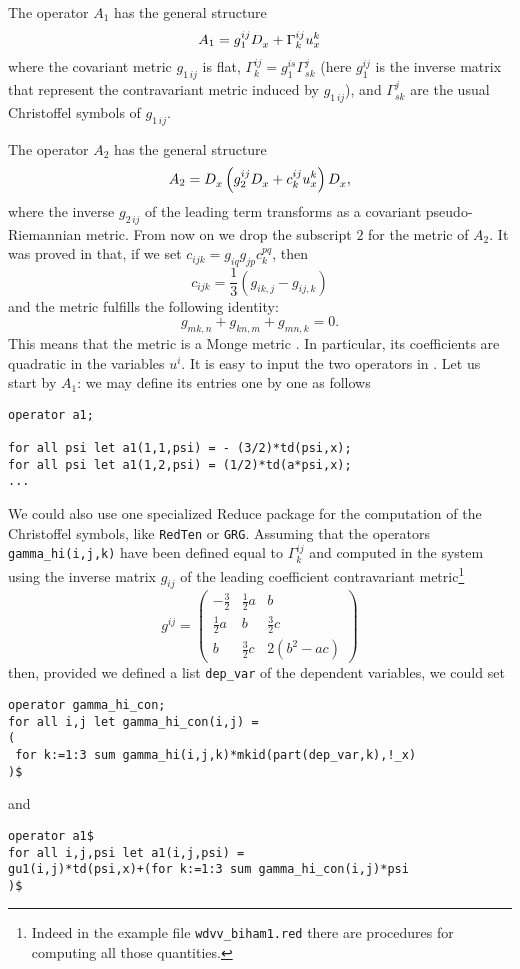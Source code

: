 The operator $A_1$ has the general structure
\[
  A_1 = g_1^{ij}D_x^{} + \Gamma^{ij}_ku^k_x
\]
where the covariant metric $g_{1\,ij}$ is flat, $\Gamma^{ij}_k =
g_1^{is}\Gamma^j_{sk}$ (here $g_1^{ij}$ is the inverse matrix that represent
the contravariant metric induced by $g_{1\,ij}$), and $\Gamma^j_{sk}$ are the
usual Christoffel symbols of $g_{1\,ij}$.

The operator $A_2$ has the general structure
\begin{equation}
  A_2=D_x^{}\left(g^{ij}_2D_x^{}+c_{k}^{ij}u_{x}^{k}\right)D_x^{},  \label{casimir}
\end{equation}
where the inverse $g_{2\,ij}$ of the leading term transforms as a covariant
pseudo-Riemannian metric. From now on we drop the subscript $2$ for the metric
of $A_2$. It was proved in \cite{Ferapontov:2014} that, if we set
$c_{ijk}=g_{iq}g_{jp}c_{k}^{pq}$, then
\[
  c_{ijk}=\frac{1}{3}(g_{ik,j}-g_{ij,k})
\]
and the metric fulfills the following identity:
\begin{equation}
  g_{mk,n}+g_{kn,m}+g_{mn,k}=0.
  \label{Killing}
\end{equation}
This means that the metric is a Monge metric \cite{Ferapontov:2014}. In particular, its
coefficients are quadratic in the variables $u^i$.
It is easy to input the two operators in \cde. Let us start by $A_1$: we may
define its entries one by one as follows
\begin{verbatim}
operator a1;

for all psi let a1(1,1,psi) = - (3/2)*td(psi,x);
for all psi let a1(1,2,psi) = (1/2)*td(a*psi,x);
...
\end{verbatim}
We could also use one specialized Reduce package for the computation of the
Christoffel symbols, like \texttt{RedTen} or \texttt{GRG}. Assuming that the
operators \texttt{gamma\_hi(i,j,k)} have been defined equal to $\Gamma^{ij}_k$
and computed in the system using the inverse matrix $g_{ij}$ of the leading
coefficient contravariant metric\footnote{Indeed in the example file
  \texttt{wdvv\_biham1.red} there are procedures for computing all those
  quantities.}
\[
  g^{ij} =
  \begin{pmatrix}
    -\frac{3}{2} & \frac{1}{2}a & b
    \\
    \frac{1}{2}a & b & \frac{3}{2}c
    \\
    b & \frac{3}{2}c & 2(b^2-ac)
  \end{pmatrix}
\]
then, provided we defined a list \texttt{dep\_var} of the dependent variables,
we could set
\begin{verbatim}
operator gamma_hi_con;
for all i,j let gamma_hi_con(i,j) =
(
 for k:=1:3 sum gamma_hi(i,j,k)*mkid(part(dep_var,k),!_x)
)$
\end{verbatim}
and
\begin{verbatim}
operator a1$
for all i,j,psi let a1(i,j,psi) =
gu1(i,j)*td(psi,x)+(for k:=1:3 sum gamma_hi_con(i,j)*psi
)$
\end{verbatim}

